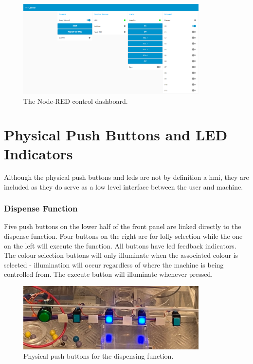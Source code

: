         \begin{figure}[H]
            \centering
            \includegraphics[width = 0.85\textwidth]{2_images/nodeRedControl}
            \caption{The Node-RED control dashboard.}
            \label{fig:nodeRedControl}
        \end{figure}  
        
\section{Physical Push Buttons and LED Indicators}
    Although the physical push buttons and \acrshort{led}s are not by definition a \acrshort{hmi}, they are included as they do serve as a low level interface between the user and machine.

    \subsubsection{Dispense Function}
        Five push buttons on the lower half of the front panel are linked directly to the dispense function. Four buttons on the right are for lolly selection while the one on the left will execute the function. All buttons have \acrshort{led} feedback indicators. The colour selection buttons will only illuminate when the associated colour is selected - illumination will occur regardless of where the machine is being controlled from. The execute button will illuminate whenever pressed.

        \begin{figure}[H]
            \centering
            \includegraphics[width = 0.85\textwidth]{2_images/physicalPushButtons}
            \caption{Physical push buttons for the dispensing function.}
            \label{fig:physicalPushButtons}
        \end{figure}          

